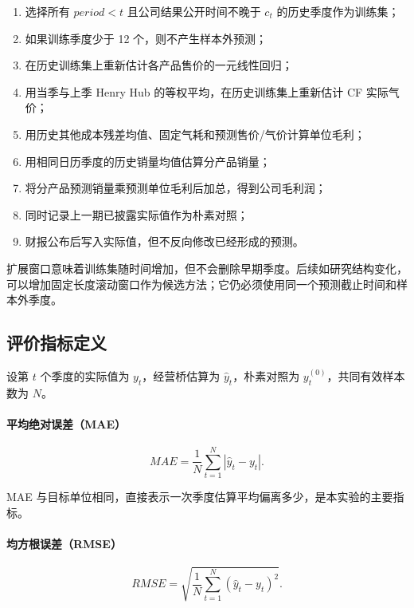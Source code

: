 \documentclass[11pt,a4paper]{ctexart}
\begin{document}
\begin{enumerate}
  \item 选择所有 $period<t$ 且公司结果公开时间不晚于 $c_t$ 的历史季度作为训练集；
  \item 如果训练季度少于 12 个，则不产生样本外预测；
  \item 在历史训练集上重新估计各产品售价的一元线性回归；
  \item 用当季与上季 Henry Hub 的等权平均，在历史训练集上重新估计 CF 实际气价；
  \item 用历史其他成本残差均值、固定气耗和预测售价/气价计算单位毛利；
  \item 用相同日历季度的历史销量均值估算分产品销量；
  \item 将分产品预测销量乘预测单位毛利后加总，得到公司毛利润；
  \item 同时记录上一期已披露实际值作为朴素对照；
  \item 财报公布后写入实际值，但不反向修改已经形成的预测。
\end{enumerate}

扩展窗口意味着训练集随时间增加，但不会删除早期季度。后续如研究结构变化，可以增加固定长度滚动窗口作为候选方法；它仍必须使用同一个预测截止时间和样本外季度。

\subsection{评价指标定义}

设第 $t$ 个季度的实际值为 $y_t$，经营桥估算为 $\widehat{y}_t$，朴素对照为 $y_t^{(0)}$，共同有效样本数为 $N$。

\paragraph{平均绝对误差（MAE）}

\begin{equation*}
MAE=\frac{1}{N}\sum_{t=1}^{N}\left|\widehat{y}_t-y_t\right|.
\end{equation*}

MAE 与目标单位相同，直接表示一次季度估算平均偏离多少，是本实验的主要指标。

\paragraph{均方根误差（RMSE）}

\begin{equation*}
RMSE=\sqrt{\frac{1}{N}\sum_{t=1}^{N}\left(\widehat{y}_t-y_t\right)^2}.
\end{equation*}
\end{document}
